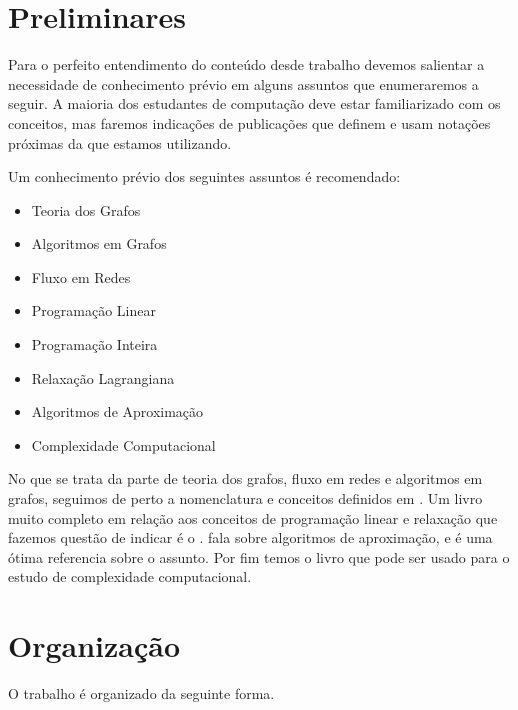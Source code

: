 \section{Preliminares}

Para o perfeito entendimento do conteúdo desde trabalho devemos 
salientar a necessidade de conhecimento prévio em alguns assuntos que 
enumeraremos a seguir. A maioria dos estudantes de computação deve estar 
familiarizado com os conceitos, mas faremos indicações de publicações 
que definem e usam notações próximas da que estamos utilizando. 

Um conhecimento prévio dos seguintes assuntos é recomendado:

\begin{itemize}
\item Teoria dos Grafos
\item Algoritmos em Grafos
\item Fluxo em Redes
\item Programação Linear
\item Programação Inteira
\item Relaxação Lagrangiana
\item Algoritmos de Aproximação
\item Complexidade Computacional
\end{itemize}


No que se trata da parte de teoria dos grafos, fluxo em redes e 
algoritmos em grafos, seguimos de perto a nomenclatura e conceitos 
definidos em \citet{pf:fluxos}. Um livro muito completo em relação aos 
conceitos de programação linear e relaxação que fazemos questão de 
indicar é o \citet{wolsey1998integer}. \citet{Carvalhoetal01} fala sobre 
algoritmos de aproximação, e é uma ótima referencia sobre o assunto.
Por fim temos o livro \citet{clrs:introalg-2001} que pode ser usado para 
o estudo de complexidade computacional.

\section{Organização}

O trabalho é organizado da seguinte forma.

